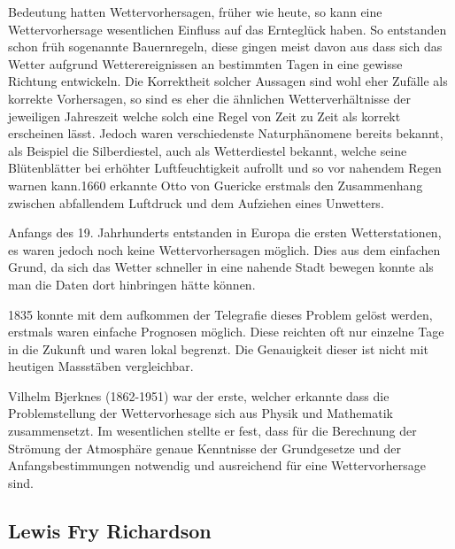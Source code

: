 \begin{refsection}
Bedeutung hatten Wettervorhersagen, früher wie heute, so kann eine Wettervorhersage wesentlichen Einfluss auf das Ernteglück haben. So entstanden schon früh sogenannte Bauernregeln, diese gingen meist davon aus dass sich das Wetter aufgrund Wetterereignissen an bestimmten Tagen in eine gewisse Richtung entwickeln. Die Korrektheit solcher Aussagen sind wohl eher Zufälle als korrekte Vorhersagen, so sind es eher die ähnlichen Wetterverhältnisse der jeweiligen Jahreszeit welche solch eine Regel von Zeit zu Zeit als korrekt erscheinen lässt. Jedoch waren verschiedenste Naturphänomene bereits bekannt, als Beispiel die Silberdiestel, auch als Wetterdiestel bekannt, welche seine Blütenblätter bei erhöhter Luftfeuchtigkeit aufrollt und so vor nahendem Regen warnen kann.1660 erkannte Otto von Guericke erstmals den Zusammenhang zwischen abfallendem Luftdruck und dem Aufziehen eines Unwetters.

Anfangs des 19. Jahrhunderts entstanden in Europa die ersten Wetterstationen, es waren jedoch noch keine Wettervorhersagen möglich. Dies aus dem einfachen Grund, da sich das Wetter schneller in eine nahende Stadt bewegen konnte als man die Daten dort hinbringen hätte können.

1835 konnte mit dem aufkommen der Telegrafie dieses Problem gelöst werden, erstmals waren einfache Prognosen möglich. Diese reichten oft nur einzelne Tage in die Zukunft und waren lokal begrenzt. Die Genauigkeit dieser ist nicht mit heutigen Massstäben vergleichbar.

Vilhelm Bjerknes (1862-1951) war der erste, welcher erkannte dass die Problemstellung der Wettervorhesage sich aus Physik und Mathematik zusammensetzt. Im wesentlichen stellte er fest, dass für die Berechnung der Strömung der Atmosphäre genaue Kenntnisse der Grundgesetze und der Anfangsbestimmungen notwendig und ausreichend für eine Wettervorhersage sind.



\subsection{Lewis Fry Richardson
\label{subsection:klima:richardson}}


\end{refsection}
